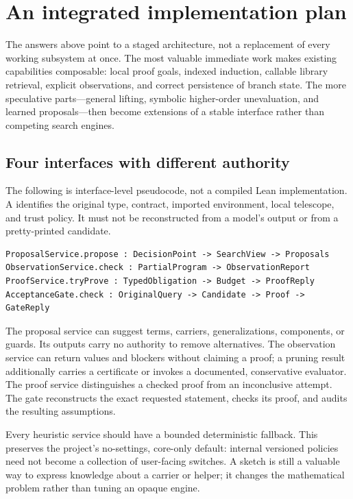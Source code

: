 \section{An integrated implementation plan}\label{sec:architecture}

The answers above point to a staged architecture, not a replacement of every
working subsystem at once. The most valuable immediate work makes existing
capabilities composable: local proof goals, indexed induction, callable library
retrieval, explicit observations, and correct persistence of branch state.
The more speculative parts---general lifting, symbolic higher-order
unevaluation, and learned proposals---then become extensions of a stable
interface rather than competing search engines.

\subsection{Four interfaces with different authority}

The following is interface-level pseudocode, not a compiled Lean implementation.
A  identifies the original type, contract, imported environment,
local telescope, and trust policy. It must not be reconstructed from a model's
output or from a pretty-printed candidate.
\begin{lstlisting}
ProposalService.propose : DecisionPoint -> SearchView -> Proposals
ObservationService.check : PartialProgram -> ObservationReport
ProofService.tryProve : TypedObligation -> Budget -> ProofReply
AcceptanceGate.check : OriginalQuery -> Candidate -> Proof -> GateReply
\end{lstlisting}
The proposal service can suggest terms, carriers, generalizations, components,
or guards. Its outputs carry no authority to remove alternatives. The
observation service can return values and blockers without claiming a proof;
a pruning result additionally carries a certificate or invokes a documented,
conservative evaluator. The proof service distinguishes a checked proof from
an inconclusive attempt. The gate reconstructs the exact requested statement,
checks its proof, and audits the resulting assumptions.

Every heuristic service should have a bounded deterministic fallback. This
preserves the project's no-settings, core-only default: internal versioned
policies need not become a collection of user-facing switches. A sketch is
still a valuable way to express knowledge about a carrier or helper; it changes
the mathematical problem rather than tuning an opaque engine.

